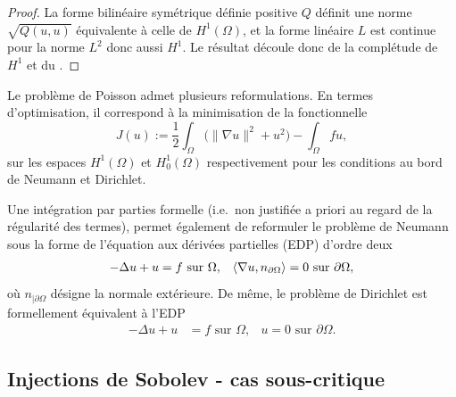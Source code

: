 \begin{proof}
	La forme bilinéaire symétrique définie positive $Q$ définit une norme $\sqrt{Q(u,u)}$ équivalente à celle de $H^1(\Omega)$, et la forme linéaire $L$ est continue pour la norme $L^2$ donc aussi $H^1$. Le résultat découle donc de la complétude de $H^1$ et du .	
\end{proof}

Le problème de Poisson admet plusieurs reformulations. En termes d'optimisation, il correspond à la minimisation de la fonctionnelle 
\begin{equation*}
	J(u) := \frac 1 2 \int_\Omega \Big(\| \nabla u\|^2 + u^2\Big) - \int_\Omega f u,
\end{equation*}
sur les espaces $H^1(\Omega)$ et $H^1_0(\Omega)$ respectivement pour les conditions au bord de Neumann et Dirichlet.

Une intégration par parties formelle (i.e.\ non justifiée a priori au regard de la régularité des termes), permet également de reformuler le problème de Neumann sous la forme de l'équation aux dérivées partielles (EDP) d'ordre deux 
\begin{align*}
	-\Delta u + u &= f \text{ sur }\Omega, &
	\langle\nabla u,n_{\partial \Omega}\rangle = 0 \text{ sur } \partial \Omega,
\end{align*}
où $n_{|\partial \Omega}$ désigne la normale extérieure. De même, le problème de Dirichlet est formellement équivalent à l'EDP
\begin{align*}
	-\Delta u + u &= f \text{ sur }\Omega, &
	u= 0 \text{ sur } \partial \Omega.
\end{align*}

\subsection{Injections de Sobolev - cas sous-critique}
\label{subsec:injSousCrit}

